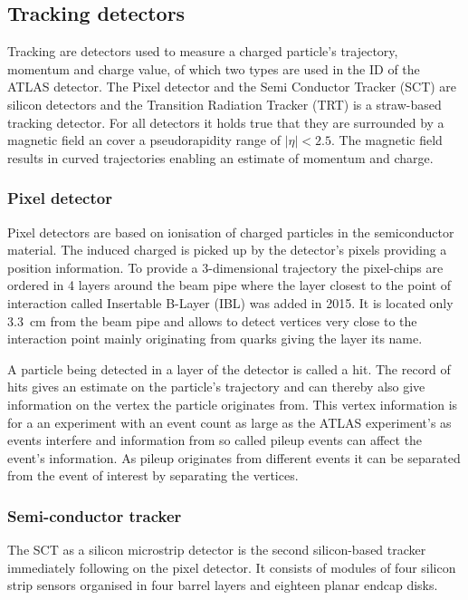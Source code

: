 \subsection{Tracking detectors}

Tracking are detectors used to measure a charged particle's trajectory, momentum and charge value, of which two types are used in the ID of the ATLAS detector. The Pixel detector and the Semi Conductor Tracker (SCT) are silicon detectors and the Transition Radiation Tracker (TRT) is a straw-based tracking detector. For all detectors it holds true that they are surrounded by a magnetic field an cover a pseudorapidity range of $|\eta| < 2.5$. The magnetic field results in curved trajectories enabling an estimate of momentum and charge.\cite{leo}

\subsubsection{Pixel detector}

Pixel detectors are based on ionisation of charged particles in the semiconductor material. The induced charged is picked up by the detector's pixels providing a position information. To provide a 3-dimensional trajectory the pixel-chips are ordered in 4 layers around the beam pipe where the layer closest to the point of interaction called Insertable B-Layer (IBL) was added in 2015. It is located only \SI{3.3}{\centi \metre} from the beam pipe and allows to detect vertices very close to the interaction point mainly originating from \Pbottom quarks giving the layer its name.~\cite{pixel_run2}

A particle being detected in a layer of the detector is called a hit. The record of hits gives an estimate on the particle's trajectory and can thereby also give information on the vertex the particle originates from. This vertex information is for a an experiment with an event count as large as the ATLAS experiment's as events interfere and information from so called pileup events can affect the event's information. As pileup originates from different events it can be separated from the event of interest by separating the vertices.

\subsubsection{Semi-conductor tracker}

The SCT as a silicon microstrip detector is the second silicon-based tracker immediately following on the pixel detector. It consists of modules of four silicon strip sensors organised in four barrel layers and eighteen planar endcap disks.

